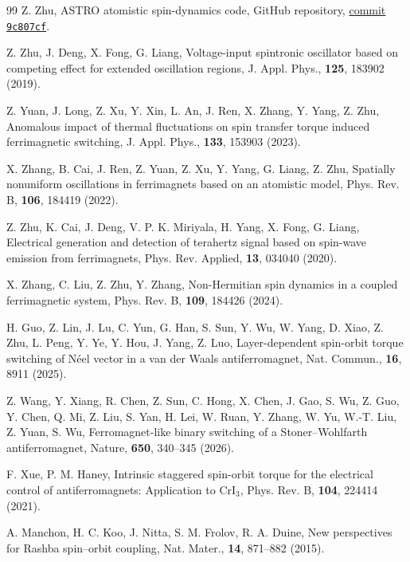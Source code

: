 \begin{thebibliography}{99}
Z. Zhu,
ASTRO atomistic spin-dynamics code,
GitHub repository, \href{https://github.com/zhuzibn/ASTRO/tree/9c807cfc189dcec7240b0f044831820238613fe1}%
{commit \texttt{9c807cf}}.

Z. Zhu, J. Deng, X. Fong, G. Liang,
Voltage-input spintronic oscillator based on competing effect for extended
oscillation regions,
J. Appl. Phys., \textbf{125}, 183902 (2019).

Z. Yuan, J. Long, Z. Xu, Y. Xin, L. An, J. Ren, X. Zhang, Y. Yang, Z. Zhu,
Anomalous impact of thermal fluctuations on spin transfer torque induced
ferrimagnetic switching,
J. Appl. Phys., \textbf{133}, 153903 (2023).

X. Zhang, B. Cai, J. Ren, Z. Yuan, Z. Xu, Y. Yang, G. Liang, Z. Zhu,
Spatially nonuniform oscillations in ferrimagnets based on an atomistic model,
Phys. Rev. B, \textbf{106}, 184419 (2022).

Z. Zhu, K. Cai, J. Deng, V. P. K. Miriyala, H. Yang, X. Fong, G. Liang,
Electrical generation and detection of terahertz signal based on spin-wave
emission from ferrimagnets,
Phys. Rev. Applied, \textbf{13}, 034040 (2020).

X. Zhang, C. Liu, Z. Zhu, Y. Zhang,
Non-Hermitian spin dynamics in a coupled ferrimagnetic system,
Phys. Rev. B, \textbf{109}, 184426 (2024).

H. Guo, Z. Lin, J. Lu, C. Yun, G. Han, S. Sun, Y. Wu, W. Yang, D. Xiao,
Z. Zhu, L. Peng, Y. Ye, Y. Hou, J. Yang, Z. Luo,
Layer-dependent spin-orbit torque switching of N\'eel vector in a van der Waals
antiferromagnet,
Nat. Commun., \textbf{16}, 8911 (2025).

Z. Wang, Y. Xiang, R. Chen, Z. Sun, C. Hong, X. Chen, J. Gao, S. Wu, Z. Guo,
Y. Chen, Q. Mi, Z. Liu, S. Yan, H. Lei, W. Ruan, Y. Zhang, W. Yu, W.-T. Liu,
Z. Yuan, S. Wu,
Ferromagnet-like binary switching of a Stoner--Wohlfarth antiferromagnet,
Nature, \textbf{650}, 340--345 (2026).

F. Xue, P. M. Haney,
Intrinsic staggered spin-orbit torque for the electrical control of
antiferromagnets: Application to CrI$_3$,
Phys. Rev. B, \textbf{104}, 224414 (2021).

A. Manchon, H. C. Koo, J. Nitta, S. M. Frolov, R. A. Duine,
New perspectives for Rashba spin--orbit coupling,
Nat. Mater., \textbf{14}, 871--882 (2015).


\end{thebibliography}
